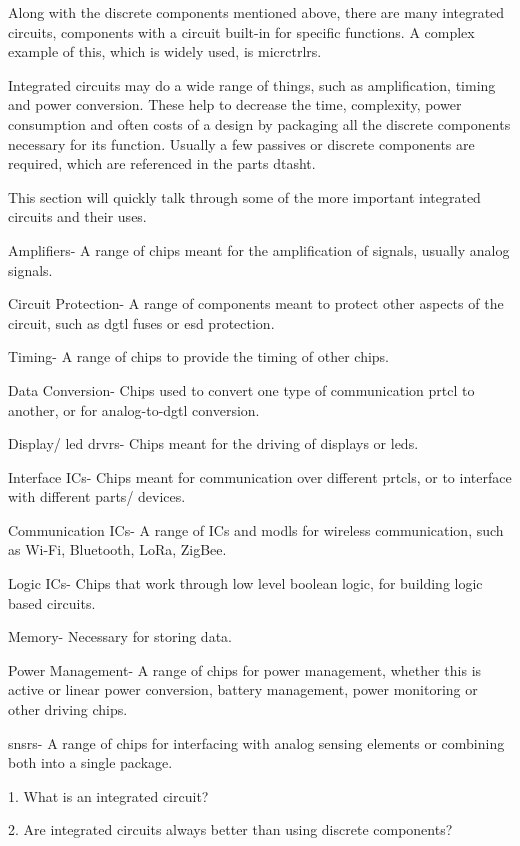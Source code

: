 \documentclass[a4paper,11pt]{report}
\newcommand{\Quiz}[1] %
{
\par\noindent %
\phantomsection %
\todo[inline, color=blue!30]{\textbf{#1}} %
\vspace{1em} %
}
\begin{document}
Along with the discrete components mentioned above, there are many integrated circuits, components with a circuit built-in for specific functions. A complex example of this, which is widely used, is \gls{micrctrlr}s.

Integrated circuits may do a wide range of things, such as amplification, timing and power conversion. These help to decrease the time, complexity, power consumption and often costs of a design by packaging all the discrete components necessary for its function. Usually a few passives or discrete components are required, which are referenced in the parts \gls{dtasht}.

This section will quickly talk through some of the more important integrated circuits and their uses.

Amplifiers- A range of chips meant for the amplification of signals, usually analog signals.

Circuit Protection- A range of components meant to protect other aspects of the circuit, such as \gls{dgtl} fuses or \gls{esd} protection.

Timing- A range of chips to provide the timing of other chips.

Data Conversion- Chips used to convert one type of communication \gls{prtcl} to another, or for analog-to-\gls{dgtl} conversion.

Display/ \gls{led} \gls{drvr}s- Chips meant for the driving of displays or \gls{led}s.

Interface ICs- Chips meant for communication over different \gls{prtcl}s, or to interface with different parts/ devices.

Communication ICs- A range of ICs and \gls{modl}s for wireless communication, such as Wi-Fi, Bluetooth, LoRa, ZigBee.

Logic ICs- Chips that work through low level boolean logic, for building logic based circuits.

Memory- Necessary for storing data.

Power Management- A range of chips for power management, whether this is active or linear power conversion, battery management, power monitoring or other driving chips.

\gls{snsr}s- A range of chips for interfacing with analog sensing elements or combining both into a single package.

\Quiz{Quiz}

1. What is an integrated circuit?

2. Are integrated circuits always better than using discrete components?
\end{document}
